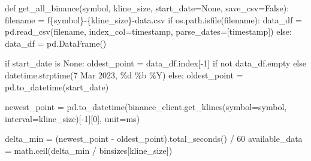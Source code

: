 \documentclass[
  letterpaper,
  DIV=11,
  numbers=noendperiod]{scrartcl}
\newenvironment{Shaded}{\begin{snugshade}}{\end{snugshade}}
\newcommand{\ControlFlowTok}[1]{\textcolor[rgb]{0.00,0.23,0.31}{#1}}
\newcommand{\DecValTok}[1]{\textcolor[rgb]{0.68,0.00,0.00}{#1}}
\newcommand{\KeywordTok}[1]{\textcolor[rgb]{0.00,0.23,0.31}{#1}}
\newcommand{\NormalTok}[1]{\textcolor[rgb]{0.00,0.23,0.31}{#1}}
\newcommand{\OperatorTok}[1]{\textcolor[rgb]{0.37,0.37,0.37}{#1}}
\newcommand{\SpecialCharTok}[1]{\textcolor[rgb]{0.37,0.37,0.37}{#1}}
\newcommand{\SpecialStringTok}[1]{\textcolor[rgb]{0.13,0.47,0.30}{#1}}
\newcommand{\StringTok}[1]{\textcolor[rgb]{0.13,0.47,0.30}{#1}}
\newcommand{\VariableTok}[1]{\textcolor[rgb]{0.07,0.07,0.07}{#1}}
\begin{document}
\begin{Shaded}
\begin{Highlighting}[]
\KeywordTok{def}\NormalTok{ get\_all\_binance(symbol, kline\_size, start\_date}\OperatorTok{=}\VariableTok{None}\NormalTok{, save\_csv}\OperatorTok{=}\VariableTok{False}\NormalTok{):}
\NormalTok{    filename }\OperatorTok{=} \SpecialStringTok{f\textquotesingle{}}\SpecialCharTok{\{}\NormalTok{symbol}\SpecialCharTok{\}}\SpecialStringTok{{-}}\SpecialCharTok{\{}\NormalTok{kline\_size}\SpecialCharTok{\}}\SpecialStringTok{{-}data.csv\textquotesingle{}}
    \ControlFlowTok{if}\NormalTok{ os.path.isfile(filename):}
\NormalTok{        data\_df }\OperatorTok{=}\NormalTok{ pd.read\_csv(filename, index\_col}\OperatorTok{=}\StringTok{\textquotesingle{}timestamp\textquotesingle{}}\NormalTok{, parse\_dates}\OperatorTok{=}\NormalTok{[}\StringTok{\textquotesingle{}timestamp\textquotesingle{}}\NormalTok{])}
    \ControlFlowTok{else}\NormalTok{:}
\NormalTok{        data\_df }\OperatorTok{=}\NormalTok{ pd.DataFrame()}

    \ControlFlowTok{if}\NormalTok{ start\_date }\KeywordTok{is} \VariableTok{None}\NormalTok{:}
\NormalTok{        oldest\_point }\OperatorTok{=}\NormalTok{ data\_df.index[}\OperatorTok{{-}}\DecValTok{1}\NormalTok{] }\ControlFlowTok{if} \KeywordTok{not}\NormalTok{ data\_df.empty }\ControlFlowTok{else}\NormalTok{ datetime.strptime(}\StringTok{\textquotesingle{}7 Mar 2023\textquotesingle{}}\NormalTok{, }\StringTok{\textquotesingle{}}\SpecialCharTok{\%d}\StringTok{ \%b \%Y\textquotesingle{}}\NormalTok{)}
    \ControlFlowTok{else}\NormalTok{:}
\NormalTok{        oldest\_point }\OperatorTok{=}\NormalTok{ pd.to\_datetime(start\_date)}

\NormalTok{    newest\_point }\OperatorTok{=}\NormalTok{ pd.to\_datetime(binance\_client.get\_klines(symbol}\OperatorTok{=}\NormalTok{symbol, interval}\OperatorTok{=}\NormalTok{kline\_size)[}\OperatorTok{{-}}\DecValTok{1}\NormalTok{][}\DecValTok{0}\NormalTok{], unit}\OperatorTok{=}\StringTok{\textquotesingle{}ms\textquotesingle{}}\NormalTok{)}

\NormalTok{    delta\_min }\OperatorTok{=}\NormalTok{ (newest\_point }\OperatorTok{{-}}\NormalTok{ oldest\_point).total\_seconds() }\OperatorTok{/} \DecValTok{60}
\NormalTok{    available\_data }\OperatorTok{=}\NormalTok{ math.ceil(delta\_min }\OperatorTok{/}\NormalTok{ binsizes[kline\_size])}


\end{Highlighting}
\end{Shaded}
\end{document}
